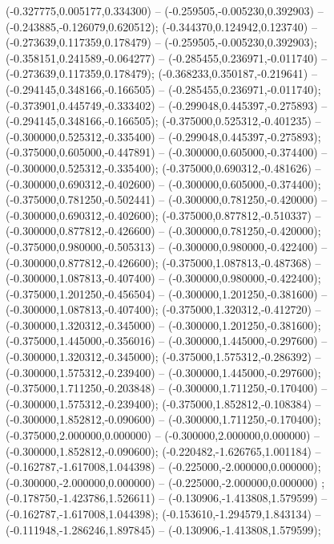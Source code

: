  (-0.327775,0.005177,0.334300) -- (-0.259505,-0.005230,0.392903) -- (-0.243885,-0.126079,0.620512);
 (-0.344370,0.124942,0.123740) -- (-0.273639,0.117359,0.178479) -- (-0.259505,-0.005230,0.392903);
 (-0.358151,0.241589,-0.064277) -- (-0.285455,0.236971,-0.011740) -- (-0.273639,0.117359,0.178479);
 (-0.368233,0.350187,-0.219641) -- (-0.294145,0.348166,-0.166505) -- (-0.285455,0.236971,-0.011740);
 (-0.373901,0.445749,-0.333402) -- (-0.299048,0.445397,-0.275893) -- (-0.294145,0.348166,-0.166505);
 (-0.375000,0.525312,-0.401235) -- (-0.300000,0.525312,-0.335400) -- (-0.299048,0.445397,-0.275893);
 (-0.375000,0.605000,-0.447891) -- (-0.300000,0.605000,-0.374400) -- (-0.300000,0.525312,-0.335400);
 (-0.375000,0.690312,-0.481626) -- (-0.300000,0.690312,-0.402600) -- (-0.300000,0.605000,-0.374400);
 (-0.375000,0.781250,-0.502441) -- (-0.300000,0.781250,-0.420000) -- (-0.300000,0.690312,-0.402600);
 (-0.375000,0.877812,-0.510337) -- (-0.300000,0.877812,-0.426600) -- (-0.300000,0.781250,-0.420000);
 (-0.375000,0.980000,-0.505313) -- (-0.300000,0.980000,-0.422400) -- (-0.300000,0.877812,-0.426600);
 (-0.375000,1.087813,-0.487368) -- (-0.300000,1.087813,-0.407400) -- (-0.300000,0.980000,-0.422400);
 (-0.375000,1.201250,-0.456504) -- (-0.300000,1.201250,-0.381600) -- (-0.300000,1.087813,-0.407400);
 (-0.375000,1.320312,-0.412720) -- (-0.300000,1.320312,-0.345000) -- (-0.300000,1.201250,-0.381600);
 (-0.375000,1.445000,-0.356016) -- (-0.300000,1.445000,-0.297600) -- (-0.300000,1.320312,-0.345000);
 (-0.375000,1.575312,-0.286392) -- (-0.300000,1.575312,-0.239400) -- (-0.300000,1.445000,-0.297600);
 (-0.375000,1.711250,-0.203848) -- (-0.300000,1.711250,-0.170400) -- (-0.300000,1.575312,-0.239400);
 (-0.375000,1.852812,-0.108384) -- (-0.300000,1.852812,-0.090600) -- (-0.300000,1.711250,-0.170400);
 (-0.375000,2.000000,0.000000) -- (-0.300000,2.000000,0.000000) -- (-0.300000,1.852812,-0.090600);
 (-0.220482,-1.626765,1.001184) -- (-0.162787,-1.617008,1.044398) -- (-0.225000,-2.000000,0.000000);
 (-0.300000,-2.000000,0.000000) -- (-0.225000,-2.000000,0.000000) ;
 (-0.178750,-1.423786,1.526611) -- (-0.130906,-1.413808,1.579599) -- (-0.162787,-1.617008,1.044398);
 (-0.153610,-1.294579,1.843134) -- (-0.111948,-1.286246,1.897845) -- (-0.130906,-1.413808,1.579599);
